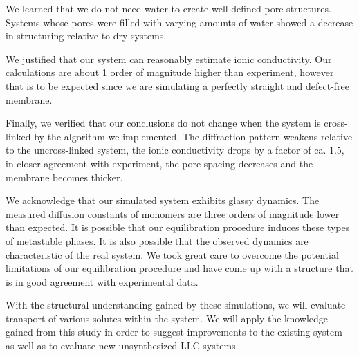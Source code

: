 \documentclass[journal=jpcbfk,manusciprt=article]{achemso}
\begin{document}
  We learned that we do not need water to create well-defined pore structures.
  Systems whose pores were filled with varying amounts of water showed a decrease
  in structuring relative to dry systems. 

  We justified that our system can reasonably estimate ionic conductivity.  Our
  calculations are about 1 order of magnitude higher than experiment, however
  that is to be expected since we are simulating a perfectly straight and
  defect-free membrane. 

  Finally, we verified that our conclusions do not change when the system is
  cross-linked by the algorithm we implemented. The diffraction pattern weakens
  relative to the uncross-linked system, the ionic conductivity drops by a factor
  of ca. 1.5, in closer agreement with experiment, the pore spacing decreases and
  the membrane becomes thicker. 

  We acknowledge that our simulated system exhibits glassy dynamics. The
  measured diffusion constants of monomers are three orders of magnitude lower
  than expected. It is possible that our equilibration procedure induces these
  types of metastable phases. It is also possible that the observed dynamics are
  characteristic of the real system. We took great care to overcome the potential
  limitations of our equilibration procedure and have come up with a structure
  that is in good agreement with experimental data.

  With the structural understanding gained by these simulations, we will
  evaluate transport of various solutes within the system. We will apply the
  knowledge gained from this study in order to suggest improvements to the
  existing system as well as to evaluate new unsynthesized LLC systems.

  \clearpage
  
\end{document}
